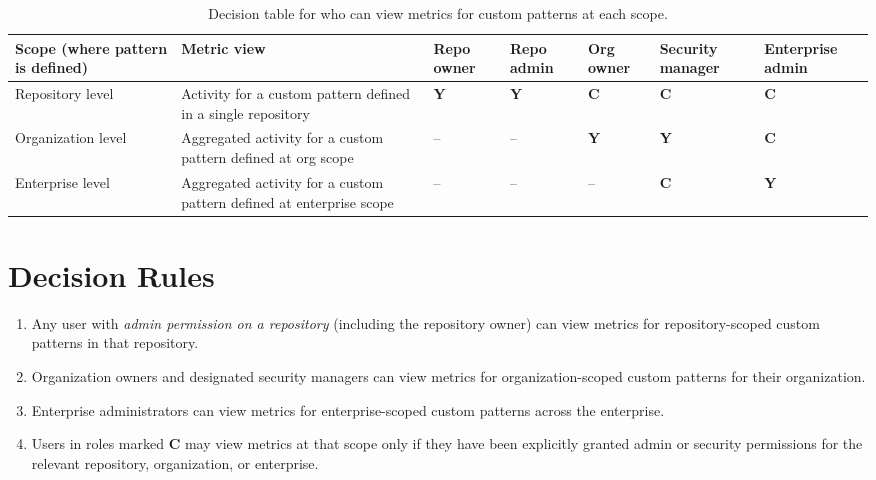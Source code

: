 \documentclass[11pt]{article}
\newcommand{\Yes}{\textbf{Y}}    %
\newcommand{\Cond}{\textbf{C}}   %
\newcommand{\No}{--}             %
\begin{document}
\begin{table}[h!]
  \centering
  \renewcommand{\arraystretch}{1.2}
  \begin{tabular}{
    >{\raggedright\arraybackslash}p{3.4cm}
    >{\raggedright\arraybackslash}p{3.1cm}
    >{\centering\arraybackslash}p{1.7cm}
    >{\centering\arraybackslash}p{1.7cm}
    >{\centering\arraybackslash}p{1.7cm}
    >{\centering\arraybackslash}p{1.9cm}
    >{\centering\arraybackslash}p{2.0cm}
  }
    \toprule
    \textbf{Scope (where pattern is defined)} &
    \textbf{Metric view} &
    \textbf{Repo owner} &
    \textbf{Repo admin} &
    \textbf{Org owner} &
    \textbf{Security manager} &
    \textbf{Enterprise admin} \\
    \midrule
    Repository level
      & Activity for a custom pattern defined in a single repository
      & \Yes  %
      & \Yes  %
      & \Cond %
      & \Cond %
      & \Cond %
      \\
    Organization level
      & Aggregated activity for a custom pattern defined at org scope
      & \No   %
      & \No   %
      & \Yes  %
      & \Yes  %
      & \Cond %
      \\
    Enterprise level
      & Aggregated activity for a custom pattern defined at enterprise scope
      & \No   %
      & \No   %
      & \No   %
      & \Cond %
      & \Yes  %
      \\
    \bottomrule
  \end{tabular}
  \caption{Decision table for who can view metrics for custom patterns at each scope.}
\end{table}

\section*{Decision Rules}

\begin{enumerate}
  \item Any user with \emph{admin permission on a repository} (including the
        repository owner) can view metrics for repository-scoped custom
        patterns in that repository.
  \item Organization owners and designated security managers can view metrics
        for organization-scoped custom patterns for their organization.
  \item Enterprise administrators can view metrics for enterprise-scoped custom
        patterns across the enterprise.
  \item Users in roles marked \Cond{} may view metrics at that scope only if
        they have been explicitly granted admin or security permissions for the
        relevant repository, organization, or enterprise.
\end{enumerate}
\end{document}
